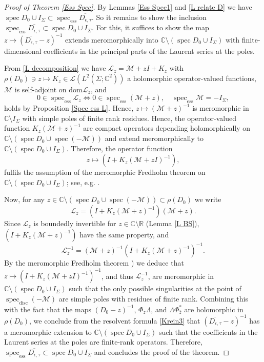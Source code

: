 \documentclass[11pt,a4paper,reqno,oneside]{amsproc}
\DeclareMathOperator{\dom}{dom}
\DeclareMathOperator{\spec}{spec}
\newcommand{\specd}{\spec_\mathrm{disc}}
\newcommand{\spece}{\spec_\mathrm{ess}}
\def \rr {{\mathbb R}}
\def \cc {{\mathbb C}}
\numberwithin{equation}{section}
\def\dom{\mathrm{dom}}
\def \cc {{\mathbb{C}}}
\begin{document}
\begin{proof}[Proof of Theorem \ref{Ess Spec}] By Lemmas \ref{Ess Spec1} and \ref{L relate D} we have $\spec D_0 \cup I_\Sigma \subset \spece \overline{D_{\epsilon,\tau}}$. So it remains to show the inclusion $\spece \overline{D_{\epsilon,\tau}}\subset \spec D_0 \cup I_\Sigma$. For this, it suffices to show the map $z \mapsto (\overline{D_{\epsilon,\tau}} -z)^{-1}$ extends meromorphically into  $\cc\setminus ( \spec D_0 \cup I_\Sigma)$ with finite-dimensional coefficients in the principal parts of the Laurent series at the poles.

From \eqref{L decomposition} we have $\mathcal L_z=\mathcal M + z I +K_z$ with $\rho(D_0)\ni z\mapsto K_z \in \mathcal L(L^2(\Sigma;\cc^2))$ a holomorphic operator-valued functions, $\mathcal M$ is self-adjoint on $\dom \mathcal L_z$, and  
\[
0\in \spece \mathcal L_z \Leftrightarrow 0\in \spece (\mathcal M+z), \quad \spece \mathcal M = -I_\Sigma,
\]
holds by Proposition \ref{Spec ess L}. Hence,  $z\mapsto (\mathcal M+z)^{-1}$ is meromorphic in $\cc\setminus I_\Sigma$ with simple poles of finite rank residues.  Hence, the operator-valued function $ K_z(\mathcal M + z )^{-1}$ are compact operators depending holomorphically on $\cc\setminus(\spec D_0\cup\spec(-\mathcal M))$ and extend meromorphically to $\cc\setminus(\spec D_0\cup I_\Sigma)$. Therefore, the operator function  
	\[
		z\mapsto (I+{K}_{z}(\mathcal{M}+zI)^{-1}),
	\]
fulfils the assumption of the meromorphic Fredholm theorem on $\cc\setminus(\spec D_0\cup I_\Sigma)$; see, e.g. \cite[Theorem XIII.13]{RS}. 

Now, for any $z\in\cc\setminus(\spec D_0 \cup\spec(-\mathcal M) ) \subset \rho(D_0)$  we write 
\[
\mathcal L_z= (I +K_z(\mathcal M + z )^{-1})(\mathcal M + z ).
\]
 Since $\mathcal L_z$ is boundedly invertible for $z\in\cc\setminus\rr$ (Lemma \ref{L BS}), $(I +K_z(\mathcal M + z )^{-1})$ have the same property, and
 \[
\mathcal L_z^{-1}= (\mathcal M + z )^{-1}(I +K_z(\mathcal M + z )^{-1})^{-1} .
\]
By the meromorphic Fredholm theorem  \cite[Theorem XIII.13]{RS}) we deduce that $z\mapsto (I+{K}_{z}(\mathcal{M}+zI)^{-1})^{-1}$, and thus $\mathcal L_z^{-1}$,  are meromorphic in $\cc\setminus(\spec D_0\cup I_\Sigma)$ such that the only possible singularities at the point of $\specd(-\mathcal M)$ are simple poles with residues of finite rank. Combining this with the fact that the maps  $(D_0-z)^{-1}$, $\Phi_z\Lambda$, and $\Lambda \Phi_{\overline{z}}^\ast$ are holomorphic in $\rho(D_0)$, we conclude from the resolvent formula \eqref{Krein3} that $(\overline{D_{\epsilon,\tau}} -z)^{-1}$ has a meromorphic extension to  $\cc\setminus ( \spec D_0 \cup I_\Sigma)$ such that the coefficients in the Laurent series at the poles are finite-rank operators. Therefore, $\spece \overline{D_{\epsilon,\tau}}\subset \spec D_0 \cup I_\Sigma$ and concludes the proof of the theorem.
\end{proof}
\end{document}

